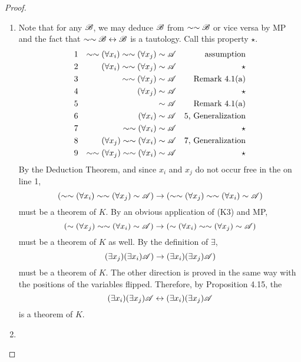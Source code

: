 \begin{proposition}
\begin{proof}
\begin{enumerate}
      \item Note that for any \wf{} \(\mathscr{B}\), we may deduce \(\mathscr{B}\) from \(\sim\sim\mathscr{B}\) or vice versa by MP and the fact that \(\sim\sim\mathscr{B} \leftrightarrow \mathscr{B}\) is a tautology. Call this property \(\star\).
        \begin{align*}
          \text{1}&&
          \sim\sim(\forall x_i)\sim\sim(\forall x_j)\sim\mathscr{A}&&
          \text{assumption}\\
          \text{2}&&
          (\forall x_i)\sim\sim(\forall x_j)\sim\mathscr{A}&&
          \text{\(\star\)}\\
          \text{3}&&
          \sim\sim(\forall x_j)\sim\mathscr{A}&&
          \text{Remark 4.1(a)}\\
          \text{4}&&
          (\forall x_j)\sim\mathscr{A}&&
          \text{\(\star\)}\\
          \text{5}&&
          \sim\mathscr{A}&&
          \text{Remark 4.1(a)}\\
          \text{6}&&
          (\forall x_i)\sim\mathscr{A}&&
          \text{5, Generalization}\\
          \text{7}&&
          \sim\sim(\forall x_i)\sim\mathscr{A}&&
          \text{\(\star\)}\\
          \text{8}&&
          (\forall x_j)\sim\sim(\forall x_i)\sim\mathscr{A}&&
          \text{7, Generalization}\\
          \text{9}&&
          \sim\sim(\forall x_j)\sim\sim(\forall x_i)\sim\mathscr{A}&&
          \text{\(\star\)}\\
        \end{align*}
        By the Deduction Theorem, and since \(x_i\) and \(x_j\) do not occur free in the \wf{} on line 1, 
        \[(\sim\sim(\forall x_i)\sim\sim(\forall x_j)\sim\mathscr{A}) \rightarrow (\sim\sim(\forall x_j)\sim\sim(\forall x_i)\sim\mathscr{A})\]
        must be a theorem of \(K\). By an obvious application of (K3) and MP,
        \[(\sim(\forall x_j)\sim\sim(\forall x_i)\sim\mathscr{A}) \rightarrow (\sim(\forall x_i)\sim\sim(\forall x_j)\sim\mathscr{A})\]
        must be a theorem of \(K\) as well. By the definition of \(\exists\),
        \[(\exists x_j)(\exists x_i)\mathscr{A}) \rightarrow (\exists x_i)(\exists x_j)\mathscr{A})\]
        must be a theorem of \(K\). The other direction is proved in the same way with the positions of the variables flipped. Therefore, by Proposition 4.15, the \wf{} 
        \[(\exists x_i)(\exists x_j)\mathscr{A} \leftrightarrow (\exists x_i)(\exists x_j)\mathscr{A}\]
        is a theorem of \(K\).

      \item %
    \end{enumerate}
  \end{proof}
\end{proposition}
